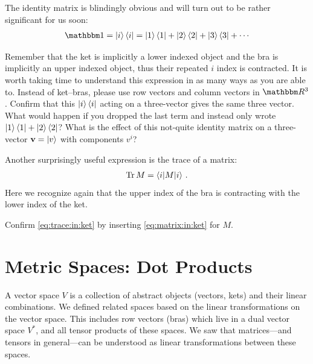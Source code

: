 \documentclass[12pt]{article}
\begin{document}
The identity matrix is blindingly obvious and will turn out to be rather significant for us soon:
\begin{align}
    \one = \ket{i}\bra{i}  = \ket{1}\bra{1} + \ket{2}\bra{2} + \ket{3}\bra{3} + \cdots
\end{align}
\begin{exercise}
Remember that the ket is implicitly a lower indexed object and the bra is implicitly an upper indexed object, thus their repeated $i$ index is contracted. It is worth taking time to understand this expression in as many ways as you are able to. Instead of ket--bras, please use row vectors and column vectors in $\RR^3$. Confirm that this $\left|i\right\rangle\left\langle i\right|$ acting on a three-vector gives the same three vector. What would happen if you dropped the last term and instead only wrote $\left|1\right\rangle\left\langle1\right| + \left|2\right\rangle\left\langle2\right|$? What is the effect of this not-quite identity matrix on a three-vector $\mathbf{v}=\left|v\right\rangle$ with components $v^i$?
\end{exercise}

Another surprisingly useful expression is the trace of a matrix:
\begin{align}
    \textnormal{Tr}\, M = \langle i | M | i \rangle \ .
    \label{eq:trace:in:ket}
\end{align}
Here we recognize again that the upper index of the bra is contracting with the lower index of the ket. 
\begin{exercise}
Confirm \eqref{eq:trace:in:ket} by inserting \eqref{eq:matrix:in:ket} for $M$. 
\end{exercise}







\section{Metric Spaces: Dot Products}
\label{sec:metric:spaces}

A vector space $V$ is a collection of abstract objects (vectors, kets) and their linear combinations. We defined related spaces based on the linear transformations on the vector space. This includes row vectors (bras) which live in a dual vector space $V^*$, and all tensor products of these spaces. We saw that matrices---and tensors in general---can be understood as linear transformations between these spaces. 
\end{document}
